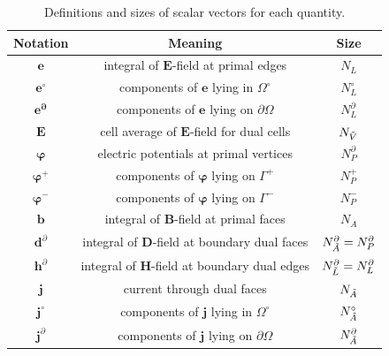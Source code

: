 \documentclass{report}
\begin{document}
\begin{table}[]
    \centering
\begin{tabular}{c c c}
     \hline
     \textbf{Notation}  & \textbf{Meaning}  & \textbf{Size} \\
     \hline
     $\mathbf{e}$ & integral of $\mathbf{E}$-field at primal edges& $N_L$ \\
     $\mathbf{e^\circ}$ & components of $\mathbf{e}$ lying in $\Omega^\circ$ & $N_L^\circ$ \\
     $\mathbf{e^\partial}$ & components of $\mathbf{e}$ lying on $\partial \Omega$ & $N_L^\partial$ \\
     $\mathbf{E}$ & cell average of $\mathbf{E}$-field for dual cells & $N_{\Tilde{V}}$ \\ 
     $\bm{\varphi}$ & electric potentials at primal vertices & $N_P^\partial$ \\
     $\bm{\varphi}^+$ & components of $\bm{\varphi}$ lying on $\Gamma^+$ & $N_P^+$ \\
     $\bm{\varphi}^-$ & components of $\bm{\varphi}$ lying on $\Gamma^-$ & $N_P^-$ \\
     $\mathbf{b}$ & integral of $\mathbf{B}$-field at primal faces & $N_A$ \\
     $\mathbf{d}^\partial$ & integral of $\mathbf{D}$-field at boundary dual faces & $N_{\Tilde{A}}^\partial = N_P^\partial$ \\
     $\mathbf{h}^\partial$ & integral of $\mathbf{H}$-field at boundary dual edges & $N_{\Tilde{L}}^\partial = N_L^\partial$ \\
     $\mathbf{j}$ & current through dual faces & $N_{\Tilde{A}}$ \\
     $\mathbf{j}^\circ$ & components of $\mathbf{j}$ lying in $\Omega^\circ$ & $N_{\Tilde{A}}^\circ$ \\
     $\mathbf{j}^\partial$ & components of $\mathbf{j}$ lying on $\partial \Omega$ & $N_{\Tilde{A}}^\partial$ \\
     \hline
\end{tabular}
    \caption{Definitions and sizes of scalar vectors for each quantity.}
    \label{tab:def_size_var}
\end{table}
\end{document}
